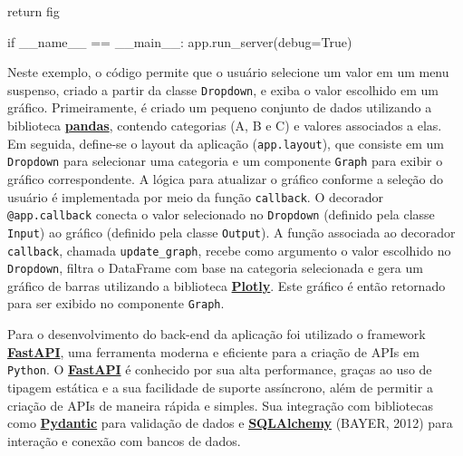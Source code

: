 \documentclass[
  12pt,
  a4paper,
]{scrreprt}
\newenvironment{Shaded}{}{}
\newcommand{\ControlFlowTok}[1]{\textcolor[rgb]{0.84,0.23,0.29}{#1}}
\newcommand{\NormalTok}[1]{\textcolor[rgb]{0.14,0.16,0.18}{#1}}
\newcommand{\OperatorTok}[1]{\textcolor[rgb]{0.14,0.16,0.18}{#1}}
\newcommand{\StringTok}[1]{\textcolor[rgb]{0.01,0.18,0.38}{#1}}
\newcommand{\VariableTok}[1]{\textcolor[rgb]{0.89,0.38,0.04}{#1}}
\begin{document}
\begin{Shaded}
\begin{Highlighting}[]
    \ControlFlowTok{return}\NormalTok{ fig}

\ControlFlowTok{if} \VariableTok{\_\_name\_\_} \OperatorTok{==} \StringTok{\textquotesingle{}\_\_main\_\_\textquotesingle{}}\NormalTok{:}
\NormalTok{    app.run\_server(debug}\OperatorTok{=}\VariableTok{True}\NormalTok{)}
\end{Highlighting}
\end{Shaded}

Neste exemplo, o código permite que o usuário selecione um valor em um
menu suspenso, criado a partir da classe \texttt{Dropdown}, e exiba o
valor escolhido em um gráfico. Primeiramente, é criado um pequeno
conjunto de dados utilizando a biblioteca
\href{https://pandas.pydata.org/}{\textbf{pandas}}, contendo categorias
(A, B e C) e valores associados a elas. Em seguida, define-se o layout
da aplicação (\texttt{app.layout}), que consiste em um \texttt{Dropdown}
para selecionar uma categoria e um componente \texttt{Graph} para exibir
o gráfico correspondente. A lógica para atualizar o gráfico conforme a
seleção do usuário é implementada por meio da função \texttt{callback}.
O decorador \texttt{@app.callback} conecta o valor selecionado no
\texttt{Dropdown} (definido pela classe \texttt{Input}) ao gráfico
(definido pela classe \texttt{Output}). A função associada ao decorador
\texttt{callback}, chamada \texttt{update\_graph}, recebe como argumento
o valor escolhido no \texttt{Dropdown}, filtra o DataFrame com base na
categoria selecionada e gera um gráfico de barras utilizando a
biblioteca \href{https://plotly.com/}{\textbf{Plotly}}. Este gráfico é
então retornado para ser exibido no componente \texttt{Graph}.

\vspace{12pt}

Para o desenvolvimento do back-end da aplicação foi utilizado o
framework \href{https://fastapi.tiangolo.com/}{\textbf{FastAPI}}, uma
ferramenta moderna e eficiente para a criação de APIs em
\texttt{Python}. O
\href{https://fastapi.tiangolo.com/}{\textbf{FastAPI}} é conhecido por
sua alta performance, graças ao uso de tipagem estática e a sua
facilidade de suporte assíncrono, além de permitir a criação de APIs de
maneira rápida e simples. Sua integração com bibliotecas como
\href{https://docs.pydantic.dev/latest/}{\textbf{Pydantic}} para
validação de dados e
\href{https://www.sqlalchemy.org/}{\textbf{SQLAlchemy}} (BAYER, 2012)
para interação e conexão com bancos de dados.

\vspace{12pt}
\end{document}
